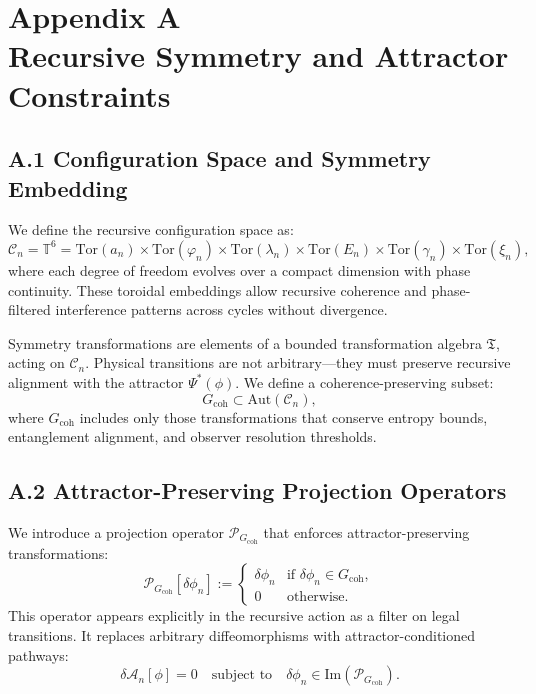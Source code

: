 \section*{Appendix A\\Recursive Symmetry and Attractor Constraints}
\label{appendix:A}

\subsection*{A.1 Configuration Space and Symmetry Embedding}

We define the recursive configuration space as:
\[
\mathcal{C}_n = \mathbb{T}^6 = \text{Tor}(a_n) \times \text{Tor}(\varphi_n) \times \text{Tor}(\lambda_n) \times \text{Tor}(E_n) \times \text{Tor}(\gamma_n) \times \text{Tor}(\xi_n),
\]
where each degree of freedom evolves over a compact dimension with phase continuity. These toroidal embeddings allow recursive coherence and phase-filtered interference patterns across cycles without divergence.

Symmetry transformations are elements of a bounded transformation algebra \( \mathfrak{T} \), acting on \( \mathcal{C}_n \). Physical transitions are not arbitrary—they must preserve recursive alignment with the attractor \( \Psi^*(\phi) \). We define a coherence-preserving subset:
\[
G_{\text{coh}} \subset \text{Aut}(\mathcal{C}_n),
\]
where \( G_{\text{coh}} \) includes only those transformations that conserve entropy bounds, entanglement alignment, and observer resolution thresholds.

\subsection*{A.2 Attractor-Preserving Projection Operators}

We introduce a projection operator \( \mathcal{P}_{G_{\text{coh}}} \) that enforces attractor-preserving transformations:
\[
\mathcal{P}_{G_{\text{coh}}}[\delta \phi_n] := 
\begin{cases}
\delta \phi_n & \text{if } \delta \phi_n \in G_{\text{coh}}, \\
0 & \text{otherwise}.
\end{cases}
\]
This operator appears explicitly in the recursive action as a filter on legal transitions. It replaces arbitrary diffeomorphisms with attractor-conditioned pathways:
\[
\delta \mathcal{A}_n[\phi] = 0 \quad \text{subject to} \quad \delta \phi_n \in \text{Im}(\mathcal{P}_{G_{\text{coh}}}).
\]

